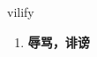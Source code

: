 
\begin{frame}
{\huge vilify}
\begin{center}
\begin{enumerate}\Large
  \item \textbf{辱骂，诽谤}
\end{enumerate}
\end{center}
\end{frame}
